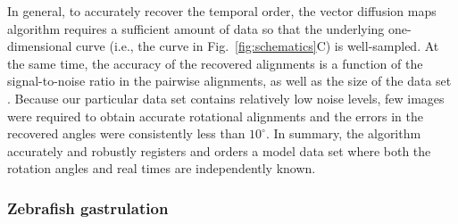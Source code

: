 \documentclass[twocolumn, 10pt]{article}
\newcommand{\fig}[0]{Fig.}
\begin{document}
In general, to accurately recover the temporal order, the vector diffusion maps algorithm requires a sufficient amount of data so that the underlying one-dimensional curve (i.e., the curve in \fig~\ref{fig:schematics}C) is well-sampled.
%
At the same time, the accuracy of the recovered alignments is a function of the signal-to-noise ratio in the pairwise alignments, as well as the size of the data set \citep{singer2011angular}.
%
Because our particular data set contains relatively low noise levels, few images were required to obtain accurate rotational alignments and the errors in the recovered angles were consistently less than $10^{\circ}$.
%
In summary, the algorithm accurately and robustly registers and orders a model data set where both the rotation angles and real times are independently known. 

\subsubsection*{Zebrafish gastrulation}
\end{document}
